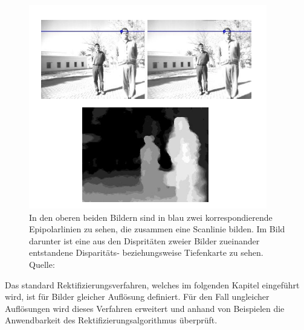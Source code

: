 %
%
%
%

\begin{figure}[!htb]
	\centering
	\includegraphics[width=.8\linewidth]{images/Disparity.png}
	\caption[Entstehung einer Disparitätskarte]{In den oberen beiden Bildern sind in blau zwei korrespondierende Epipolarlinien zu sehen, die zusammen eine Scanlinie bilden. Im Bild darunter ist eine aus den Dispritäten zweier Bilder zueinander entstandene Disparitäts- beziehungsweise Tiefenkarte zu sehen. Quelle: \cite{Javier}} 
	\label{fig:DisparityMap}
\end{figure}

\pagebreak

Das standard Rektifizierungsverfahren, welches im folgenden Kapitel eingeführt wird, ist für Bilder gleicher Auflösung definiert. Für den Fall ungleicher Auflösungen wird dieses Verfahren erweitert und anhand von Beispielen die Anwendbarkeit des Rektifizierungsalgorithmus überprüft. 


